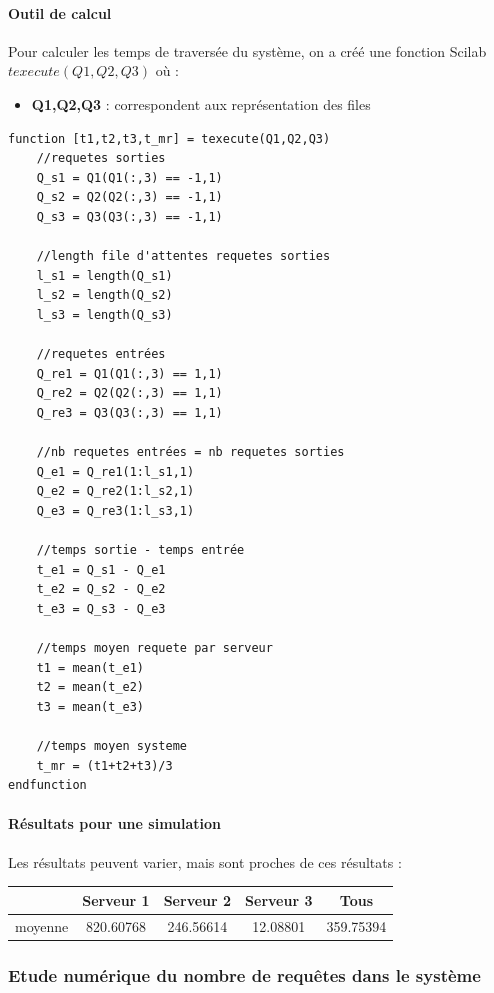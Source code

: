 \documentclass{article}
\begin{document}
\paragraph{Outil de calcul}
Pour calculer les temps de traversée du système, on a créé une fonction Scilab $texecute(Q1,Q2,Q3)$ où :
\begin{itemize}
	\item \textbf{Q1,Q2,Q3} : correspondent aux représentation des files 
\end{itemize}
\begin{verbatim}
function [t1,t2,t3,t_mr] = texecute(Q1,Q2,Q3)
    //requetes sorties
    Q_s1 = Q1(Q1(:,3) == -1,1)
    Q_s2 = Q2(Q2(:,3) == -1,1)
    Q_s3 = Q3(Q3(:,3) == -1,1)

    //length file d'attentes requetes sorties
    l_s1 = length(Q_s1)
    l_s2 = length(Q_s2)
    l_s3 = length(Q_s3)

    //requetes entrées
    Q_re1 = Q1(Q1(:,3) == 1,1)
    Q_re2 = Q2(Q2(:,3) == 1,1)
    Q_re3 = Q3(Q3(:,3) == 1,1)

    //nb requetes entrées = nb requetes sorties
    Q_e1 = Q_re1(1:l_s1,1)
    Q_e2 = Q_re2(1:l_s2,1)
    Q_e3 = Q_re3(1:l_s3,1)

    //temps sortie - temps entrée 
    t_e1 = Q_s1 - Q_e1
    t_e2 = Q_s2 - Q_e2
    t_e3 = Q_s3 - Q_e3

    //temps moyen requete par serveur
    t1 = mean(t_e1)
    t2 = mean(t_e2)
    t3 = mean(t_e3)

    //temps moyen systeme
    t_mr = (t1+t2+t3)/3
endfunction
\end{verbatim}

\paragraph{Résultats pour une simulation}
Les résultats peuvent varier, mais sont proches de ces résultats :
\begin{center}
	\begin{tabular}{c|ccc|c}
		\hline \hline
		& Serveur 1 & Serveur 2 & Serveur 3 & Tous \\
		\hline
		moyenne & 820.60768 & 246.56614 & 12.08801 & 359.75394 \\
		\hline \hline
	\end{tabular}
\end{center}

\subsubsection{Etude numérique du nombre de requêtes dans le système}
\end{document}
